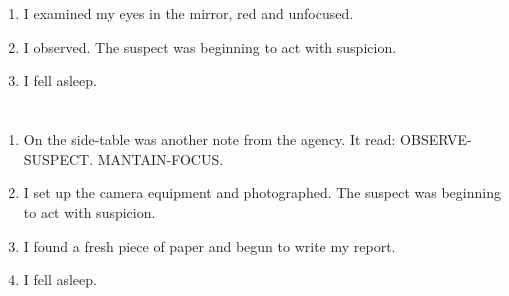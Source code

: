\documentclass{article}
\begin{document}
    \newpage
    
    \section{}
    
    \begin{enumerate}
    
    \item I examined my eyes in the mirror, red and unfocused.\\
    
    \item I observed. The suspect was beginning to act with suspicion.\\
    
    \item I fell asleep.\\
    
    \end{enumerate}
     
    \newpage
    
    \section{}
    
    \begin{enumerate}
    
    \item On the side-table was another note from the agency. It read: OBSERVE-SUSPECT. MANTAIN-FOCUS.\\
    
    \item I set up the camera equipment and photographed. The suspect was beginning to act with suspicion.\\
    
    \item I found a fresh piece of paper and begun to write my report.\\
    
    \item I fell asleep.\\
    
    \end{enumerate}
     
    \newpage
    
    \section{}
    
\end{document}
